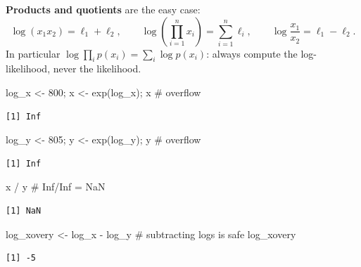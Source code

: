 \documentclass[
  letterpaper,
  DIV=11,
  numbers=noendperiod]{scrreprt}
\newenvironment{Shaded}{\begin{snugshade}}{\end{snugshade}}
\newcommand{\CommentTok}[1]{\textcolor[rgb]{0.37,0.37,0.37}{#1}}
\newcommand{\DecValTok}[1]{\textcolor[rgb]{0.68,0.00,0.00}{#1}}
\newcommand{\FunctionTok}[1]{\textcolor[rgb]{0.28,0.35,0.67}{#1}}
\newcommand{\NormalTok}[1]{\textcolor[rgb]{0.00,0.23,0.31}{#1}}
\newcommand{\OtherTok}[1]{\textcolor[rgb]{0.00,0.23,0.31}{#1}}
\newcommand{\SpecialCharTok}[1]{\textcolor[rgb]{0.37,0.37,0.37}{#1}}
\begin{document}
\textbf{Products and quotients} are the easy case: \[
\log(x_1 x_2) = \ell_1 + \ell_2, \qquad \log\left(\prod_{i=1}^{n} x_i\right) = \sum_{i=1}^{n} \ell_i, \qquad \log\frac{x_1}{x_2} = \ell_1 - \ell_2.
\] In particular \(\log \prod_i p(x_i) = \sum_i \log p(x_i)\): always
compute the log-likelihood, never the likelihood.

\begin{Shaded}
\begin{Highlighting}[]
\NormalTok{log\_x }\OtherTok{\textless{}{-}} \DecValTok{800}\NormalTok{; x }\OtherTok{\textless{}{-}} \FunctionTok{exp}\NormalTok{(log\_x); x          }\CommentTok{\# overflow}
\end{Highlighting}
\end{Shaded}

\begin{verbatim}
[1] Inf
\end{verbatim}

\begin{Shaded}
\begin{Highlighting}[]
\NormalTok{log\_y }\OtherTok{\textless{}{-}} \DecValTok{805}\NormalTok{; y }\OtherTok{\textless{}{-}} \FunctionTok{exp}\NormalTok{(log\_y); y          }\CommentTok{\# overflow}
\end{Highlighting}
\end{Shaded}

\begin{verbatim}
[1] Inf
\end{verbatim}

\begin{Shaded}
\begin{Highlighting}[]
\NormalTok{x }\SpecialCharTok{/}\NormalTok{ y                                     }\CommentTok{\# Inf/Inf = NaN}
\end{Highlighting}
\end{Shaded}

\begin{verbatim}
[1] NaN
\end{verbatim}

\begin{Shaded}
\begin{Highlighting}[]
\NormalTok{log\_xovery }\OtherTok{\textless{}{-}}\NormalTok{ log\_x }\SpecialCharTok{{-}}\NormalTok{ log\_y               }\CommentTok{\# subtracting logs is safe}
\NormalTok{log\_xovery}
\end{Highlighting}
\end{Shaded}

\begin{verbatim}
[1] -5
\end{verbatim}
\end{document}
